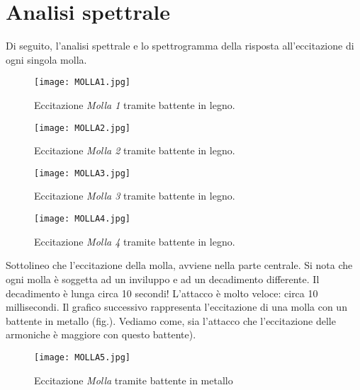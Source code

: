 \section{Analisi spettrale}
Di seguito, l'analisi spettrale e lo spettrogramma della risposta all'eccitazione di ogni singola molla. 
 \begin{figure}[htbp]
         \centering
        \texttt{[image: MOLLA1.jpg]}
          \caption{Eccitazione \textit{Molla 1} tramite battente in legno.}
\end{figure}
 \begin{figure}[htbp]
 \centering
        \texttt{[image: MOLLA2.jpg]}
        \caption{Eccitazione \textit{Molla 2} tramite battente in legno.}
\end{figure}
 \begin{figure}[htbp]
        \centering
        \texttt{[image: MOLLA3.jpg]}
           \caption{Eccitazione \textit{Molla 3} tramite battente in legno.}
\end{figure}
 \begin{figure}[htbp]
        \centering
        \texttt{[image: MOLLA4.jpg]}
               \caption{Eccitazione \textit{Molla 4} tramite battente in legno.}
\end{figure}
Sottolineo che l'eccitazione della molla, avviene nella parte centrale.
Si nota che ogni molla è soggetta ad un inviluppo e ad un decadimento differente. Il decadimento è lunga circa 10 secondi! L'attacco è molto veloce: circa 10 millisecondi. Il grafico successivo rappresenta l'eccitazione di una molla con un battente in metallo (fig.). Vediamo come, sia l'attacco che l'eccitazione delle armoniche è maggiore con questo battente). 
 \begin{figure}[htbp]
        \centering
        \texttt{[image: MOLLA5.jpg]}
               \caption{Eccitazione \textit{Molla} tramite battente in metallo}
\end{figure}

